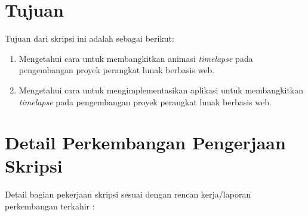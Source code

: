 \documentclass[a4paper,twoside]{article}
\begin{document}
\section{Tujuan}
Tujuan dari skripsi ini adalah sebagai berikut:
\begin{enumerate}
	\item Mengetahui cara untuk membangkitkan animasi \textit{timelapse} pada pengembangan proyek perangkat lunak berbasis web.
	\item Mengetahui cara untuk mengimplementasikan aplikasi untuk membangkitkan \textit{timelapse} pada pengembangan proyek perangkat lunak berbasis web.
\end{enumerate}



\section{Detail Perkembangan Pengerjaan Skripsi}
Detail bagian pekerjaan skripsi sesuai dengan rencan kerja/laporan perkembangan terkahir :
\end{document}
